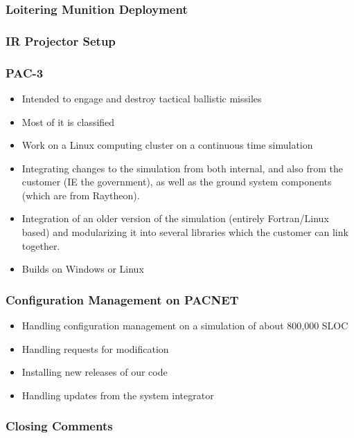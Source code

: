 \documentclass[aspectratio=169]{beamer}
\begin{document}
\begin{frame}
  \frametitle{Loitering Munition Deployment}
\end{frame}

\begin{frame}
  \frametitle{IR Projector Setup}
\end{frame}


\begin{frame}
  \frametitle{PAC-3} %
  \begin{itemize}
  \item Intended to engage and destroy tactical ballistic missiles
  \item Most of it is classified
  \item Work on a Linux computing cluster on a continuous time simulation
  \item Integrating changes to the simulation from both internal, and also from the customer (IE the government), as well as the ground system components (which are from Raytheon).
  \item Integration of an older version of the simulation (entirely Fortran/Linux based) and modularizing it into several libraries which the customer can link together.
  \item Builds on Windows or Linux
  \end{itemize}
\end{frame}

\begin{frame}
  \frametitle{Configuration Management on PACNET}
  \begin{itemize}
  \item Handling configuration management on a simulation of about 800,000 SLOC
  \item Handling requests for modification
  \item Installing new releases of our code
  \item Handling updates from the system integrator
  \end{itemize}
\end{frame}

\begin{frame}
  \frametitle{Closing Comments}

\end{frame}
\end{document}
